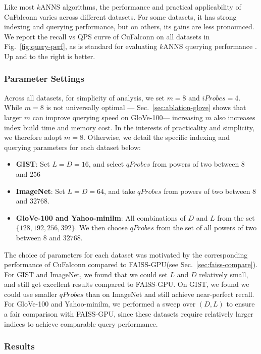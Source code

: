 \documentclass{article}
\newcommand{\cf}{CuFalconn\xspace}
\newcommand{\fgpu}{FAISS-GPU\xspace}
\newcommand{\glv}{GloVe-100\xspace}
\newcommand{\imgnt}{ImageNet\xspace}
\newcommand{\ymlm}{Yahoo-minilm\xspace}
\begin{document}
Like most $k$ANNS algorithms, the performance and practical applicability of \cf varies across different datasets. For some datasets, it has strong indexing and querying performance, but on others, its gains are less pronounced. We report the recall vs QPS curve of \cf on all datasets in Fig.~\ref{fig:query-perf}, as is standard for evaluating $k$ANNS querying performance \cite{aumuller2020ann, jaasaari2025vibe}. Up and to the right is better. 

\subsubsection{Parameter Settings} 
\label{sec:exp-params}

Across all datasets, for simplicity of analysis, we set $m=8$ and $iProbes=4$. While $m = 8$ is not universally optimal — Sec.~\ref{sec:ablation-glove} shows that larger $m$ can improve querying speed on \glv — increasing $m$ also increases index build time and memory cost. In the interests of practicality and simplicity, we therefore adopt $m = 8$. Otherwise, we detail the specific indexing and querying parameters for each dataset below:

\begin{itemize}
    \item \textbf{GIST}: Set $L = D = 16$, and select $qProbes$ from powers of two between $8$ and $256$
    \item \textbf{ImageNet}: Set $L = D = 64$, and take $qProbes$ from powers of two between 8 and 32768.
    \item \textbf{\glv and \ymlm}: All combinations of $D$ and $L$ from the set $\{128, 192, 256, 392\}$. We then choose $qProbes$ from the set of all powers of two between $8$ and $32768$.
\end{itemize}

\newpage

The choice of parameters for each dataset was motivated by the corresponding performance of \cf compared to \fgpu (see Sec.~\ref{sec:faiss-compare}). For GIST and \imgnt, we found that we could set $L$ and $D$ relatively small, and still get excellent results compared to \fgpu. On GIST, we found we could use smaller $qProbes$ than on ImageNet and still achieve near-perfect recall. For \glv and \ymlm, we performed a sweep over $(D, L)$ to ensure a fair comparison with \fgpu, since these datasets require relatively larger indices to achieve comparable query performance.

\subsubsection{Results}
\end{document}
